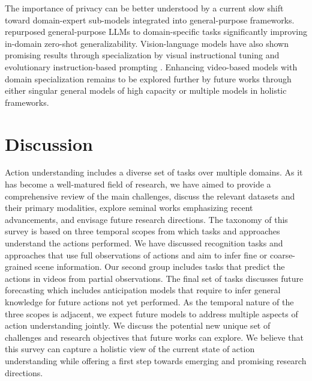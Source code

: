 The importance of privacy can be better understood by a current slow shift toward domain-expert sub-models integrated into general-purpose frameworks. \citet{shen2024tag} repurposed general-purpose LLMs to domain-specific tasks significantly improving in-domain zero-shot generalizability. Vision-language models have also shown promising results through specialization by visual instructional tuning \citep{bai2024generalist} and evolutionary instruction-based prompting \citep{luo2024mmevol}. Enhancing video-based models with domain specialization remains to be explored further by future works through either singular general models of high capacity or multiple models in holistic frameworks.  




\section{Discussion}
\label{sec:discussion}

Action understanding includes a diverse set of tasks over multiple domains. As it has become a well-matured field of research, we have aimed to provide a comprehensive review of the main challenges, discuss the relevant datasets and their primary modalities, explore seminal works emphasizing recent advancements, and envisage future research directions. The taxonomy of this survey is based on three temporal scopes from which tasks and approaches understand the actions performed.  We have discussed recognition tasks and approaches that use full observations of actions and aim to infer fine or coarse-grained scene information. Our second group includes tasks that predict the actions in videos from partial observations. The final set of tasks discusses future forecasting which includes anticipation models that require to infer general knowledge for future actions not yet performed. As the temporal nature of the three scopes is adjacent, we expect future models to address multiple aspects of action understanding jointly. We discuss the potential new unique set of challenges and research objectives that future works can explore. We believe that this survey can capture a holistic view of the current state of action understanding while offering a first step towards emerging and promising research directions.  